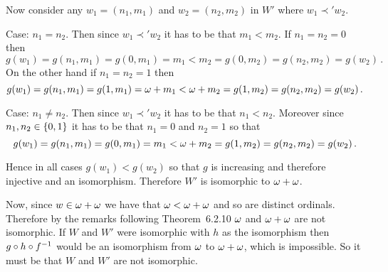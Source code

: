 {{    Now consider any $w_1 = (n_1,m_1)$ and $w_2 = (n_2, m_2)$ in $W'$ where $w_1 \prec' w_2$.

    Case: $n_1 = n_2$.
    Then since $w_1 \prec' w_2$ it has to be that $m_1 < m_2$.
    If $n_1 = n_2 = 0$ then
    $$
    g(w_1) = g(n_1,m_1) = g(0,m_1) = m_1 < m_2 = g(0, m_2) = g(n_2,m_2) = g(w_2) \,.
    $$
    On the other hand if $n_1 = n_2 = 1$ then
    $$
    g(w_1) = g(n_1,m_1) = g(1,m_1) = \omega + m_1 < \omega + m_2 = g(1, m_2) = g(n_2,m_2) = g(w_2) \,.
    $$

    Case: $n_1 \neq n_2$.
    Then since $w_1 \prec' w_2$ it has to be that $n_1 < n_2$.
    Moreover since $n_1,n_2 \in \left\{ 0,1 \right\}$ it has to be that $n_1 = 0$ and $n_2 = 1$ so that
    $$
    g(w_1) = g(n_1,m_1) = g(0,m_1) = m_1 < \omega + m_2 = g(1,m_2) = g(n_2,m_2) = g(w_2) \,.
    $$

    Hence in all cases $g(w_1) < g(w_2)$ so that $g$ is increasing and therefore injective and an isomorphism.
    Therefore $W'$ is isomorphic to $\omega + \omega$.

    Now, since $w \in \omega+\omega$ we have that $\omega < \omega+\omega$ and so are distinct ordinals.
    Therefore by the remarks following Theorem~6.2.10 $\omega$ and $\omega+\omega$ are not isomorphic.
    If $W$ and $W'$ were isomorphic with $h$ as the isomorphism then $g \circ h \circ f^{-1}$ would be an isomorphism from $\omega$ to $\omega + \omega$, which is impossible.
    So it must be that $W$ and $W'$ are not isomorphic.
  }
}
